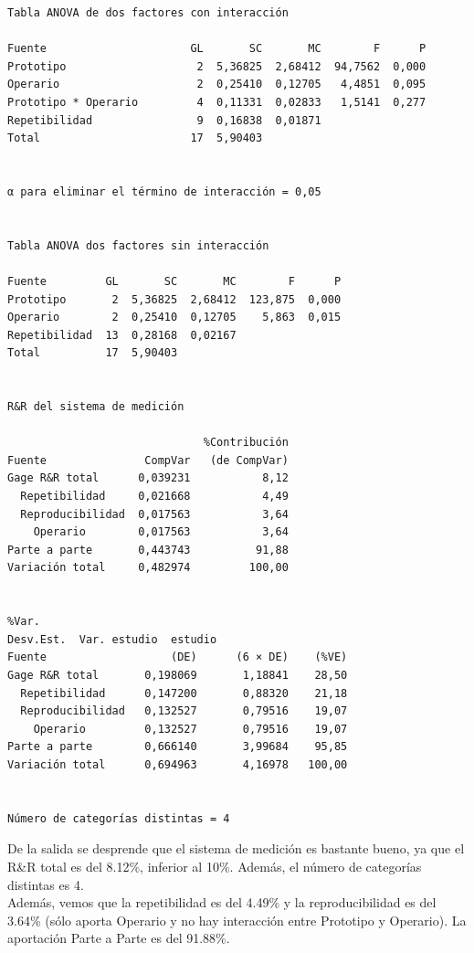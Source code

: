 \documentclass[12pt,a4paper,twoside,openright,titlepage,final]{article}
\begin{document}
\begin{verbatim}
Tabla ANOVA de dos factores con interacción 

Fuente                      GL       SC       MC        F      P
Prototipo                    2  5,36825  2,68412  94,7562  0,000
Operario                     2  0,25410  0,12705   4,4851  0,095
Prototipo * Operario         4  0,11331  0,02833   1,5141  0,277
Repetibilidad                9  0,16838  0,01871
Total                       17  5,90403


α para eliminar el término de interacción = 0,05


Tabla ANOVA dos factores sin interacción 

Fuente         GL       SC       MC        F      P
Prototipo       2  5,36825  2,68412  123,875  0,000
Operario        2  0,25410  0,12705    5,863  0,015
Repetibilidad  13  0,28168  0,02167
Total          17  5,90403


R&R del sistema de medición 

                              %Contribución
Fuente               CompVar   (de CompVar)
Gage R&R total      0,039231           8,12
  Repetibilidad     0,021668           4,49
  Reproducibilidad  0,017563           3,64
    Operario        0,017563           3,64
Parte a parte       0,443743          91,88
Variación total     0,482974         100,00


%Var.
Desv.Est.  Var. estudio  estudio
Fuente                   (DE)      (6 × DE)    (%VE)
Gage R&R total       0,198069       1,18841    28,50
  Repetibilidad      0,147200       0,88320    21,18
  Reproducibilidad   0,132527       0,79516    19,07
    Operario         0,132527       0,79516    19,07
Parte a parte        0,666140       3,99684    95,85
Variación total      0,694963       4,16978   100,00


Número de categorías distintas = 4
\end{verbatim}

De la salida se desprende que el sistema de medición es bastante bueno, ya que el R\&R total es del 8.12\%, inferior al 10\%. Además, el número de categorías distintas es 4.\\

Además, vemos que la repetibilidad es del 4.49\% y la reproducibilidad es del 3.64\% (sólo aporta Operario y no hay interacción entre Prototipo y Operario). La aportación Parte a Parte es del 91.88\%.\\
\end{document}
